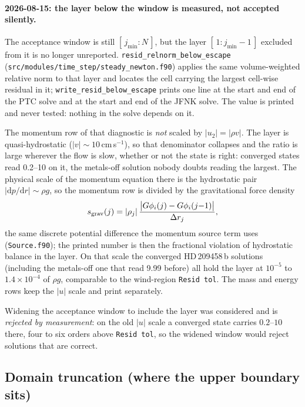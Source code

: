 \documentclass[english,a4paper]{my_memo}
\begin{document}
\paragraph{2026-08-15: the layer below the window is measured, not accepted
silently.} The acceptance window is still $[\,j_{\min}:N\,]$, but the layer
$[\,1:j_{\min}{-}1\,]$ excluded from it is no longer unreported.
\texttt{resid\_relnorm\_below\_escape}
(\texttt{src/modules/time\_step/steady\_newton.f90}) applies the same
volume-weighted relative norm to that layer and locates the cell carrying
the largest cell-wise residual in it;
\texttt{write\_resid\_below\_escape} prints one line at the start and end
of the PTC solve and at the start and end of the JFNK solve. The value is
printed and never tested: nothing in the solve depends on it.

The momentum row of that diagnostic is \emph{not} scaled by
$|u_2| = |\rho v|$. The layer is quasi-hydrostatic ($|v|\sim10$\,cm\,s$^{-1}$),
so that denominator collapses and the ratio is large wherever the flow is
slow, whether or not the state is right: converged states read 0.2--10 on
it, the metals-off solution nobody doubts reading the largest. The physical
scale of the momentum equation there is the hydrostatic pair
$|\mathrm{d}p/\mathrm{d}r| \sim \rho g$, so the momentum row is divided by
the gravitational force density
\begin{equation}
s_{\rm grav}(j) = |\rho_j|\,
   \frac{\big|G\phi_i(j) - G\phi_i(j{-}1)\big|}{\Delta r_j},
\end{equation}
the same discrete potential difference the momentum source term uses
(\texttt{Source.f90}); the printed number is then the fractional violation
of hydrostatic balance in the layer. On that scale the converged
HD\,209458\,b solutions (including the metals-off one that read 9.99
before) all hold the layer at $10^{-5}$ to $1.4\times10^{-4}$ of
$\rho g$, comparable to the wind-region \texttt{Resid tol}. The mass and
energy rows keep the $|u|$ scale and print separately.

Widening the acceptance window to include the layer was considered and is
\emph{rejected by measurement}: on the old $|u|$ scale a converged state
carries $0.2$--$10$ there, four to six orders above \texttt{Resid tol}, so
the widened window would reject solutions that are correct.

\subsection{Domain truncation (where the upper boundary sits)}
\end{document}
